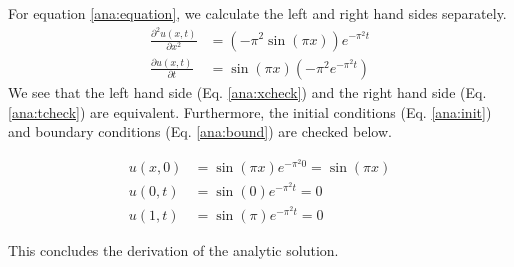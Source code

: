 For equation \ref{ana:equation}, we calculate the left and right hand sides separately.
\begin{align}
    \label{ana:xcheck}
    \frac{\partial^2 u(x,t)}{\partial x^2} &= \left(-\pi^2 \sin(\pi x)\right) e^{-\pi^2 t} \\
    \label{ana:tcheck}
    \frac{\partial u(x,t)}{\partial t} &=  \sin(\pi x) \left(-\pi^2 e^{-\pi^2 t}\right)
\end{align}
We see that the left hand side (Eq. \ref{ana:xcheck}) and the right hand side (Eq. \ref{ana:tcheck}) are equivalent.
Furthermore, the initial conditions (Eq. \ref{ana:init}) and boundary conditions (Eq. \ref{ana:bound}) are checked below.

\begin{align*}
    u(x, 0) &= \sin(\pi x) e^{-\pi^2 0} = \sin(\pi x) \\
    u(0, t) &= \sin(0)e^{-\pi^2 t} = 0 \\
    u(1, t) &= \sin(\pi)e^{-\pi^2 t} = 0
\end{align*}

This concludes the derivation of the analytic solution.